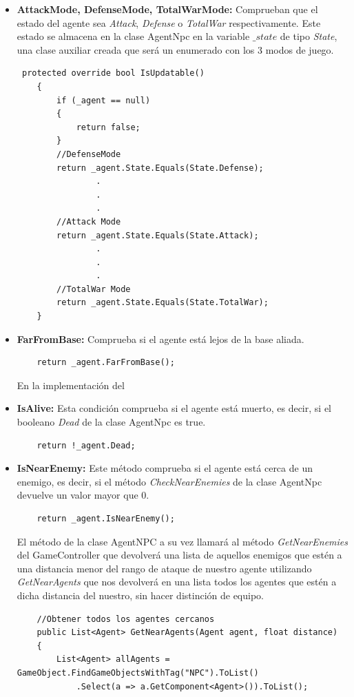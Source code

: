 \begin{itemize}
    \item \textbf{AttackMode, DefenseMode, TotalWarMode:} Comprueban que el estado del agente sea \textit{Attack}, \textit{Defense} o \textit{TotalWar} respectivamente. Este estado se almacena en la clase AgentNpc en la variable \textit{$\_state$} de tipo \textit{State}, una clase auxiliar creada que será un enumerado con los 3 modos de juego.
    \begin{lstlisting}
 protected override bool IsUpdatable()
    {
        if (_agent == null)
        {
            return false;
        }
        //DefenseMode
        return _agent.State.Equals(State.Defense);
                .
                .
                .
        //Attack Mode
        return _agent.State.Equals(State.Attack);
                .
                .
                .
        //TotalWar Mode
        return _agent.State.Equals(State.TotalWar);
    }
    \end{lstlisting}
    
    \item \textbf{FarFromBase:} Comprueba si el agente está lejos de la base aliada.%
    \begin{lstlisting}
    return _agent.FarFromBase();
    \end{lstlisting}
    En la implementación del 
    \item \textbf{IsAlive:} Esta condición comprueba si el agente está muerto, es decir, si el booleano \textit{Dead} de la clase AgentNpc es true.
    \begin{lstlisting}
    return !_agent.Dead;
    \end{lstlisting}
    \item \textbf{IsNearEnemy:} Este método comprueba si el agente está cerca de un enemigo, es decir, si el método \textit{CheckNearEnemies} de la clase AgentNpc devuelve un valor mayor que 0. 
    \begin{lstlisting}
    return _agent.IsNearEnemy();
    \end{lstlisting}
    El método de la clase AgentNPC a su vez llamará al método \textit{GetNearEnemies} del GameController que devolverá una lista de aquellos enemigos que estén a una distancia menor del rango de ataque de nuestro agente utilizando \textit{GetNearAgents} que nos devolverá en una lista todos los agentes que estén a dicha distancia del nuestro, sin hacer distinción de equipo.
    \begin{lstlisting}
    //Obtener todos los agentes cercanos
    public List<Agent> GetNearAgents(Agent agent, float distance)
    {
        List<Agent> allAgents = GameObject.FindGameObjectsWithTag("NPC").ToList()
            .Select(a => a.GetComponent<Agent>()).ToList();


\end{lstlisting}
\end{itemize}
